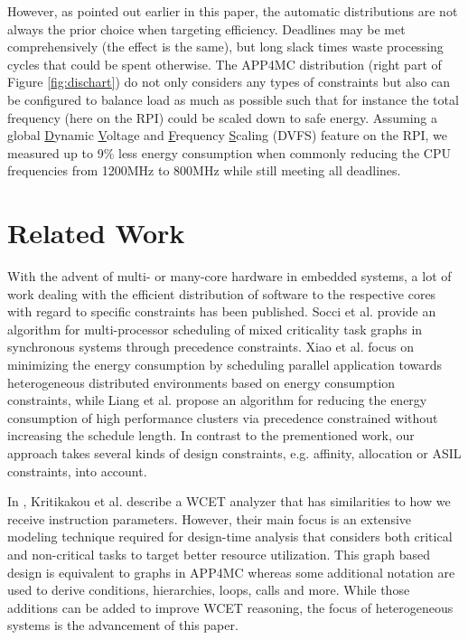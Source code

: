 \documentclass [a4paper,final,conference,10pt]{IDAACS}
\begin{document}
However, as pointed out earlier in this paper, the automatic distributions are not always the prior choice when targeting efficiency. Deadlines may be met comprehensively (the effect is the same), but long slack times waste processing cycles that could be spent otherwise. The APP4MC distribution (right part of Figure \ref{fig:dischart}) do not only considers any types of constraints but also can be configured to balance load as much as possible such that for instance the total frequency (here on the RPI) could be scaled down to safe energy. Assuming a global \underline{D}ynamic \underline{V}oltage and \underline{F}requency \underline{S}caling (DVFS) feature on the RPI, we measured up to 9\% less energy consumption when commonly reducing the CPU frequencies from 1200MHz to 800MHz while still meeting all deadlines.  %

\section{Related Work}
\label{sec:relatedWork}
With the advent of multi- or many-core hardware in embedded systems, a lot of work dealing with the efficient distribution of software to the respective cores with regard to specific constraints has been published. Socci et al. \cite{Socci2015} provide an algorithm for multi-processor scheduling of mixed criticality task graphs in synchronous systems through precedence constraints. 
Xiao et al. \cite{Xiao2016} focus on minimizing the energy consumption by scheduling parallel application towards heterogeneous distributed environments based on energy consumption constraints, while Liang et al. \cite{LiXi13} propose an algorithm for reducing the energy consumption of high performance clusters via precedence
constrained without increasing the schedule length. In contrast to the prementioned work, our approach takes several kinds of design constraints, e.g. affinity, allocation or ASIL constraints, into account.

In \cite{Kritikakou2014}, Kritikakou et al. describe a WCET analyzer that has similarities to how we receive instruction parameters. However, their main focus is an extensive modeling technique required for design-time analysis that considers both critical and non-critical tasks to target better resource utilization. This graph based design is equivalent to graphs in APP4MC whereas some additional notation are used to derive conditions, hierarchies, loops, calls and more. While those additions can be added to improve WCET reasoning, the focus of heterogeneous systems is the advancement of this paper.
\end{document}
